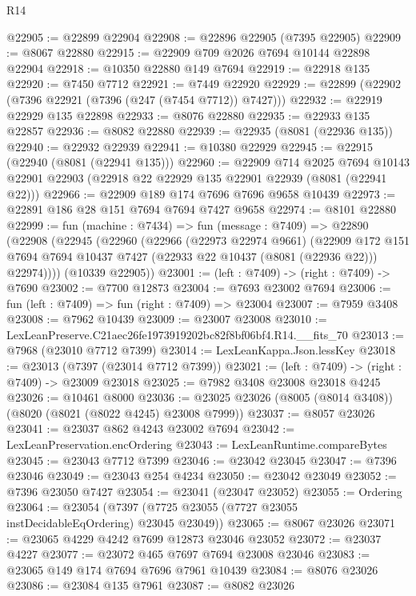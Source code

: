 \begin{lexlean}{R14}
\begin{coremodule}
@22905 := @22899 @22904
@22908 := @22896 @22905 (@7395 @22905)
@22909 := @8067 @22880
@22915 := @22909 @709 @2026 @7694 @10144 @22898 @22904
@22918 := @10350 @22880 @149 @7694
@22919 := @22918 @135
@22920 := @7450 @7712
@22921 := @7449 @22920
@22929 := @22899 (@22902 (@7396 @22921 (@7396 (@247 (@7454 @7712)) @7427)))
@22932 := @22919 @22929 @135 @22898
@22933 := @8076 @22880
@22935 := @22933 @135 @22857
@22936 := @8082 @22880
@22939 := @22935 (@8081 (@22936 @135))
@22940 := @22932 @22939
@22941 := @10380 @22929
@22945 := @22915 (@22940 (@8081 (@22941 @135)))
@22960 := @22909
    @714
    @2025
    @7694
    @10143
    @22901
    @22903
    (@22918 @22 @22929 @135 @22901 @22939 (@8081 (@22941 @22)))
@22966 := @22909 @189 @174 @7696 @7696 @9658 @10439
@22973 := @22891 @186 @28 @151 @7694 @7694 @7427 @9658
@22974 := @8101 @22880
@22999 := fun (machine : @7434) =>
  fun (message : @7409) =>
  @22890
    (@22908
      (@22945
        (@22960
          (@22966
            (@22973 @22974 @9661)
            (@22909
              @172
              @151
              @7694
              @7694
              @10437
              @7427
              (@22933 @22 @10437 (@8081 (@22936 @22)))
              @22974))))
      (@10339 @22905))
@23001 := (left : @7409) -> (right : @7409) -> @7690
@23002 := @7700 @12873
@23004 := @7693 @23002 @7694
@23006 := fun (left : @7409) => fun (right : @7409) => @23004
@23007 := @7959 @3408
@23008 := @7962 @10439
@23009 := @23007 @23008
@23010 := LexLeanPreserve.C21aec26fe1973919202bc82f8bf06bf4.R14.__fits_70
@23013 := @7968 (@23010 @7712 @7399)
@23014 := LexLeanKappa.Json.lessKey
@23018 := @23013 (@7397 (@23014 @7712 @7399))
@23021 := (left : @7409) -> (right : @7409) -> @23009 @23018
@23025 := @7982 @3408 @23008 @23018 @4245
@23026 := @10461 @8000
@23036 := @23025 @23026 (@8005 (@8014 @3408)) (@8020 (@8021 (@8022 @4245) @23008 @7999))
@23037 := @8057 @23026
@23041 := @23037 @862 @4243 @23002 @7694
@23042 := LexLeanPreservation.encOrdering
@23043 := LexLeanRuntime.compareBytes
@23045 := @23043 @7712 @7399
@23046 := @23042 @23045
@23047 := @7396 @23046
@23049 := @23043 @254 @4234
@23050 := @23042 @23049
@23052 := @7396 @23050 @7427
@23054 := @23041 (@23047 @23052)
@23055 := Ordering
@23064 := @23054 (@7397 (@7725 @23055 (@7727 @23055 instDecidableEqOrdering) @23045 @23049))
@23065 := @8067 @23026
@23071 := @23065 @4229 @4242 @7699 @12873 @23046 @23052
@23072 := @23037 @4227
@23077 := @23072 @465 @7697 @7694 @23008 @23046
@23083 := @23065 @149 @174 @7694 @7696 @7961 @10439
@23084 := @8076 @23026
@23086 := @23084 @135 @7961
@23087 := @8082 @23026

\end{coremodule}
\end{lexlean}
